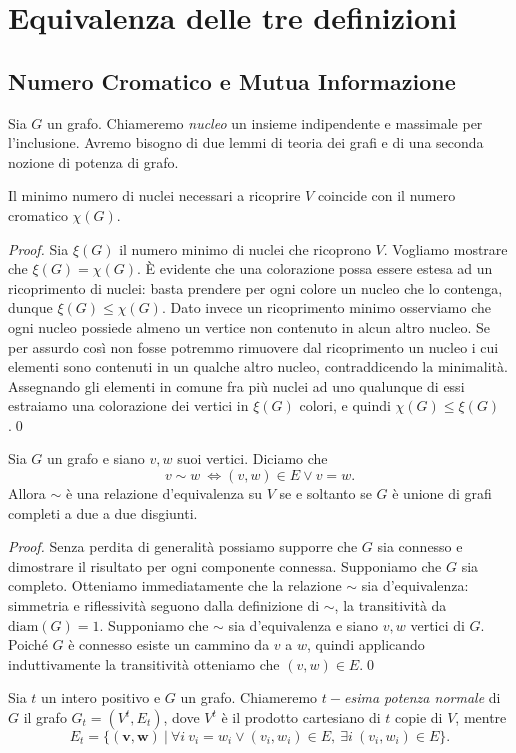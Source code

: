 \section{Equivalenza delle tre definizioni}

\subsection{Numero Cromatico e Mutua Informazione}

Sia \(G\) un grafo. Chiameremo \emph{nucleo} un insieme indipendente e massimale per l'inclusione. Avremo bisogno di due lemmi di teoria dei grafi e di una seconda nozione di potenza di grafo. 
\begin{lemma}
	\label{minkernellemma} Il minimo numero di nuclei necessari a ricoprire \(V\) coincide con il numero cromatico \(\chi(G)\). 
\end{lemma}
\begin{proof}
	Sia \(\xi(G)\) il numero minimo di nuclei che ricoprono \(V\). Vogliamo mostrare che \(\xi(G)=\chi(G)\). È evidente che una colorazione possa essere estesa ad un ricoprimento di nuclei: basta prendere per ogni colore un nucleo che lo contenga, dunque \(\xi(G)\le \chi(G)\). Dato invece un ricoprimento minimo osserviamo che ogni nucleo possiede almeno un vertice non contenuto in alcun altro nucleo. Se per assurdo così non fosse potremmo rimuovere dal ricoprimento un nucleo i cui elementi sono contenuti in un qualche altro nucleo, contraddicendo la minimalità. Assegnando gli elementi in comune fra più nuclei ad uno qualunque di essi estraiamo una colorazione dei vertici in \(\xi(G)\) colori, e quindi \(\chi(G)\le \xi(G)\).\qed 
\end{proof}
\begin{lemma}
	\label{releqlemma} Sia \(G\) un grafo e siano \(v,w\) suoi vertici. Diciamo che
	\[v\sim w\ \iff (v,w)\in E\vee v=w.\]
	Allora \(\sim\) è una relazione d'equivalenza su \(V\) se e soltanto se \(G\) è unione di grafi completi a due a due disgiunti. 
\end{lemma}
\begin{proof}
	Senza perdita di generalità possiamo supporre che \(G\) sia connesso e dimostrare il risultato per ogni componente connessa. Supponiamo che \(G\) sia completo. Otteniamo immediatamente che la relazione \(\sim\) sia d'equivalenza: simmetria e riflessività seguono dalla definizione di \(\sim\), la transitività da \(\text{diam}(G)=1\). Supponiamo che \(\sim\) sia d'equivalenza e siano \(v,w\) vertici di \(G\). Poiché \(G\) è connesso esiste un cammino da \(v\) a \(w\), quindi applicando induttivamente la transitività otteniamo che \((v,w)\in E\).\qed 
\end{proof}
\begin{definition}
	Sia \(t\) un intero positivo e \(G\) un grafo. Chiameremo \emph{\(t-\)esima potenza normale} di \(G\) il grafo \(G_t=(V^t, E_t)\), dove \(V^t\) è il prodotto cartesiano di \(t\) copie di \(V\), mentre
	\[E_t=\{(\mathbf{v},\mathbf{w})\ \vert\ \forall i\ v_i = w_i\vee (v_i, w_i)\in E,\ \exists i\ (v_i,w_i)\in E\}.\]
\end{definition}


